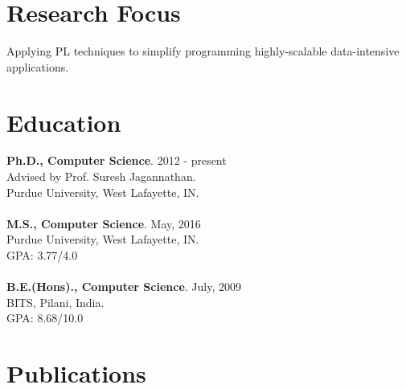 \documentclass[margin,line]{res}
\begin{document}
 
 
 
\address{http://gowthamk.github.io \hspace{1.25in} gkaki@purdue.edu
          \hspace{1.25in} (201) 417 1775 }

 
\begin{resume} 
 
\section{Research Focus}
Applying PL techniques to simplify programming highly-scalable
  data-intensive applications.

\section{Education} 
{\bf Ph.D., Computer Science}. \hfill 2012 - present\\
Advised by Prof. Suresh Jagannathan.\\
Purdue University, West Lafayette, IN.\\
\\
{\bf M.S., Computer Science}. \hfill May, 2016\\
Purdue University, West Lafayette, IN.\\
GPA: 3.77/4.0 \\
\\
{\bf B.E.(Hons)., Computer Science}. \hfill July, 2009\\
BITS, Pilani, India.\\
GPA: 8.68/10.0
 

\section{Publications}


\end{resume}
\end{document}
